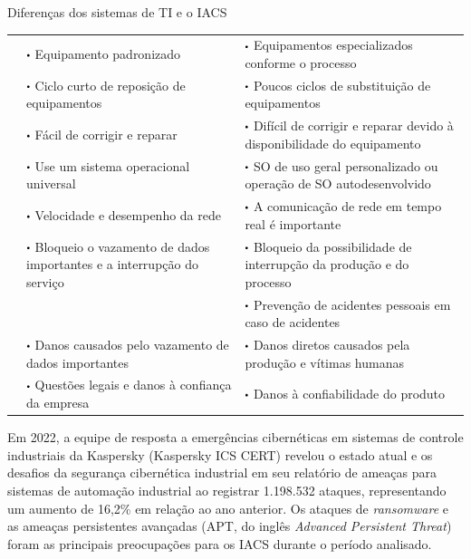     \begin{quadro}[htbp]
        \caption{\label{qdr:it-iacs}Diferenças dos sistemas de TI e o IACS}
        \begin{tabular}{|M{3.25cm}|p{5.50cm}|p{5.50cm}|}
            \hline
             &  &  \\
            \hline
             & $\sbullet$ Equipamento padronizado & $\sbullet$ Equipamentos especializados conforme o processo \\
            & $\sbullet$ Ciclo curto de reposição de equipamentos & $\sbullet$ Poucos ciclos de substituição de equipamentos \\
            & $\sbullet$ Fácil de corrigir e reparar & $\sbullet$ Difícil de corrigir e reparar devido à disponibilidade do equipamento \\
            & $\sbullet$ Use um sistema operacional universal & $\sbullet$ SO de uso geral personalizado ou operação de SO autodesenvolvido\\
            & $\sbullet$ Velocidade e desempenho da rede & $\sbullet$ A comunicação de rede em tempo real é importante\\
            \hline
             & $\sbullet$ Bloqueio o vazamento de dados importantes e a interrupção do serviço & $\sbullet$ Bloqueio da possibilidade de interrupção da produção e do processo \\
            & & $\sbullet$ Prevenção de acidentes pessoais em caso de acidentes \\
            \hline
             & $\sbullet$ Danos causados pelo vazamento de dados importantes & $\sbullet$ Danos diretos causados pela produção e vítimas humanas \\
            & $\sbullet$ Questões legais e danos à confiança da empresa & $\sbullet$ Danos à confiabilidade do produto \\
            \hline
	\end{tabular}
	\begin{flushleft}
	\end{flushleft}
    \end{quadro}

    Em 2022, a equipe de resposta a emergências cibernéticas em sistemas de controle industriais da Kaspersky (Kaspersky ICS CERT) revelou o estado atual e os desafios da segurança cibernética industrial em seu relatório de ameaças para sistemas de automação industrial \cite{kaspersky2023} ao registrar 1.198.532 ataques, representando um aumento de 16,2\% em relação ao ano anterior. Os ataques de \textit{ransomware} e as ameaças persistentes avançadas (APT, do inglês \textit{Advanced Persistent Threat}) foram as principais preocupações para os IACS durante o período analisado.

